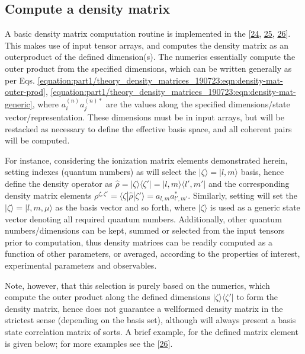 \documentclass[letterpaper,table,10pt,english]{jupyterBook}
\begin{document}
\subsection{Compute a density matrix}
\label{\detokenize{part1/theory_density_matrices_190723:compute-a-density-matrix}}
\sphinxAtStartPar
A basic density matrix computation routine is implemented in the  {[}\hyperlink{cite.backmatter/bibliography:id655}{24}, \hyperlink{cite.backmatter/bibliography:id597}{25}, \hyperlink{cite.backmatter/bibliography:id595}{26}{]}. This makes use of input tensor arrays, and computes the density matrix as an outer\sphinxhyphen{}product of the defined dimension(s). The numerics essentially compute the outer product from the specified dimensions, which can be written generally as per Eqs. \eqref{equation:part1/theory_density_matrices_190723:eqn:density-mat-outer-prod}, \eqref{equation:part1/theory_density_matrices_190723:eqn:density-mat-generic}, where \(a_{i}^{(n)}a_{j}^{(n)*}\) are the values along the specified dimensions/state vector/representation. These dimensions must be in input arrays, but will be restacked as necessary to define the effective basis space, and all coherent pairs will be computed.

\sphinxAtStartPar
For instance, considering the ionization matrix elements demonstrated herein, setting indexes (quantum numbers) as \sphinxcode{\sphinxupquote{{[}l,m{]}}} will select the \(|\zeta\rangle = |l,m\rangle\) basis, hence define the density operator as \(\hat{\rho} = |\zeta\rangle \langle\zeta'| = |l,m\rangle\langle l',m'|\) and the corresponding density matrix elements \(\rho^{\zeta,\zeta'}=\langle\zeta|\hat{\rho}|\zeta'\rangle=a_{l,m}a_{l',m'}^{*}\). Similarly, setting \sphinxcode{\sphinxupquote{{[}'l','m','mu'{]}}} will set the \(|\zeta\rangle = |l,m,\mu\rangle\) as the basis vector and so forth, where \(|\zeta\rangle\) is used as a generic state vector denoting all required quantum numbers. Additionally, other quantum numbers/dimensions can be kept, summed or selected from the input tensors prior to computation, thus density matrices can be readily computed as a function of other parameters, or averaged, according to the properties of interest, experimental parameters and observables.

\sphinxAtStartPar
Note, however, that this selection is purely based on the numerics, which compute the outer product along the defined dimensions \(|\zeta\rangle\langle\zeta'|\) to form the density matrix, hence does not guarantee a well\sphinxhyphen{}formed density matrix in the strictest sense (depending on the basis set), although will always present a basis state correlation matrix of sorts. A brief example, for the  defined matrix element is given below; for more examples see the  {[}\hyperlink{cite.backmatter/bibliography:id595}{26}{]}.
\end{document}
